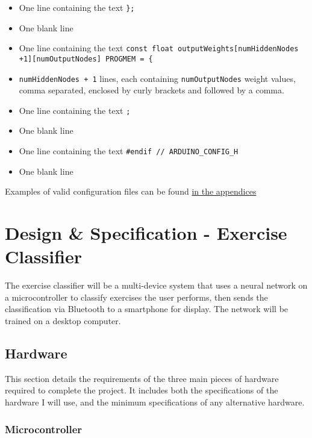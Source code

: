 \documentclass[a4paper]{article}
\begin{document}
\begin{itemize}
\item One line containing the text \lstinline|};|
\item One blank line
\item One line containing the text \lstinline|const float outputWeights[numHiddenNodes +1][numOutputNodes] PROGMEM = {|
\item \lstinline{numHiddenNodes + 1} lines, each containing \lstinline{numOutputNodes} weight values, comma separated, enclosed by curly brackets and followed by a comma.
\item One line containing the text \lstinline|;|
\item One blank line
\item One line containing the text \lstinline{#endif // ARDUINO_CONFIG_H}
\item One blank line
\end{itemize}

\normalsize
Examples of valid configuration files can be found \hyperref[subsec:a2_configfiles]{in the appendices}

\newpage
\section{Design \& Specification - Exercise Classifier}
\label{sec:dc}

The exercise classifier will be a multi-device system that uses a neural network on a microcontroller to classify exercises the user performs, then sends the classification via Bluetooth to a smartphone for display. The network will be trained on a desktop computer.

\subsection{Hardware}%
\label{subsec:dc_hardware}

This section details the requirements of the three main pieces of hardware required to complete the project. It includes both the specifications of the hardware I will use, and the minimum specifications of any alternative hardware.

\subsubsection{Microcontroller}
\end{document}
